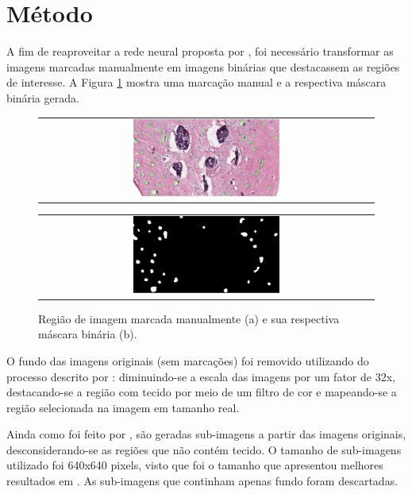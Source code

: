 \section{Método}
\label{method}
A fim de reaproveitar a rede neural proposta por \cite{santos2022automated}, foi necessário transformar as imagens marcadas manualmente em imagens binárias que destacassem as regiões de interesse. A Figura \ref{fig:preprocessing-steps} mostra uma marcação manual e a respectiva máscara binária gerada.

\begin{figure}[h]
    \center
    \begin{tabular}{@{}c@{}}\includegraphics[width=0.45\textwidth]{figures/3_methods/preprocess/preprocess_step_0.png}
    \end{tabular}
    \begin{tabular}{@{}c@{}}
        \includegraphics[width=0.45\textwidth]{figures/3_methods/preprocess/preprocess_step_3.png}
    \end{tabular}
  
    \caption[Região de imagem marcada manualmente e sua respectiva máscara binária.]{Região de imagem marcada manualmente (a) e sua respectiva máscara binária (b).}
    \label{fig:preprocessing-steps}
\end{figure}

O fundo das imagens originais (sem marcações) foi removido utilizando do processo descrito por \cite{santos2022automated}: diminuindo-se a escala das imagens por um fator de 32x, destacando-se a região com tecido por meio de um filtro de cor e mapeando-se a região selecionada na imagem em tamanho real.

Ainda como foi feito por \cite{santos2022automated}, são geradas sub-imagens a partir das imagens originais, desconsiderando-se as regiões que não contém tecido. O tamanho de sub-imagens utilizado foi 640x640 pixels, visto que foi o tamanho que apresentou melhores resultados em \cite{santos2022automated}. As sub-imagens que continham apenas fundo foram descartadas.


